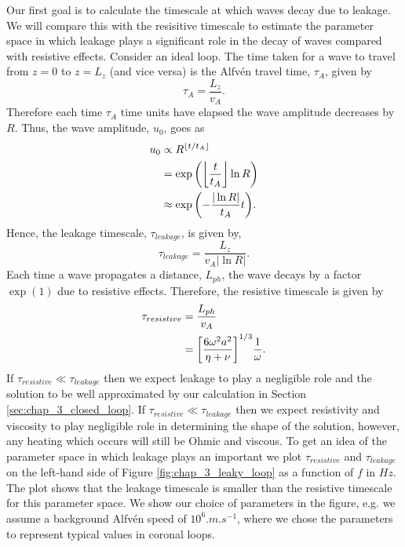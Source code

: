 Our first goal is to calculate the timescale at which waves decay due to leakage. We will compare this with the resisitive timescale to estimate the parameter space in which leakage plays a significant role in the decay of waves compared with resistive effects. Consider an ideal loop. The time taken for a wave to travel from $z=0$ to $z=L_z$ (and vice versa) is the Alfv\'en travel time, $\tau_A$, given by
\begin{equation}
    \label{eq:chap_3_alfven_travel_time}
    \tau_A = \frac{L_z}{v_A}.
\end{equation}
Therefore each time $\tau_A$ time units have elapsed the wave amplitude decreases by $R$. Thus, the wave amplitude, $u_0$, goes as
\begin{equation}
    \begin{aligned}
    u_0 &\propto R^{\lfloor t / t_{A} \rfloor} \\
    &= \exp\qty(\left\lfloor\frac{t}{t_A}\right\rfloor\ln R) \\
    &\approx \exp\qty(-\frac{|\ln R|}{t_A}t).
    \end{aligned}
\end{equation}
Hence, the leakage timescale, $\tau_{leakage}$, is given by,
\begin{equation}
    \tau_{leakage} = \frac{L_z}{v_A |\ln R|}.
\end{equation}
Each time a wave propagates a distance, $L_{ph}$, the wave decays by a factor $\exp(1)$ due to resistive effects. Therefore, the resistive timescale is given by 
\begin{equation}
\begin{aligned}
    \tau_{resistive} &= \frac{L_{ph}}{v_A} \\
    &= \qty[\frac{6\omega^2a^2}{\eta+\nu}]^{1/3}\frac{1}{\omega}.
\end{aligned}
\end{equation}
If $\tau_{resistive}\ll\tau_{leakage}$ then we expect leakage to play a negligible role and the solution to be well approximated by our calculation in Section \ref{sec:chap_3_closed_loop}. If $\tau_{resistive}\ll\tau_{leakage}$ then we expect resistivity and viscosity to play negligible role in determining the shape of the solution, however, any heating which occurs will still be Ohmic and viscous. To get an idea of the parameter space in which leakage plays an important we plot $\tau_{resistive}$ and $\tau_{leakage}$ on the left-hand side of Figure \ref{fig:chap_3_leaky_loop} as a function of $f$ in $\si{Hz}$. The plot shows that the leakage timescale is smaller than the resistive timescale for this parameter space. We show our choice of parameters in the figure, e.g. we assume a background Alfv\'en speed of $10^6\si{.m.s^{-1}}$, where we chose the parameters to represent typical values in coronal loops.

